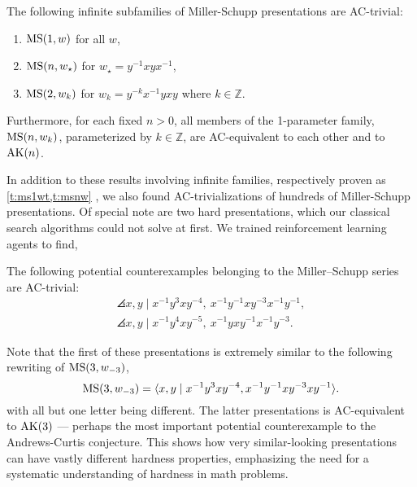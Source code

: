 \begin{introtheorem}
        The following infinite subfamilies of Miller-Schupp presentations are AC-trivial:
        \begin{enumerate}[label=(\roman*)]
            \item $\text{MS}(1, w)$ for all $w$,
            \item $\text{MS}(n, w_\star)$ for $w_\star = y^{-1} x y x^{-1}$,
            \item $\text{MS}(2, w_k)$ for $w_k = y^{-k} x^{-1} y x y$ where $k \in \mathbb{Z}$.
        \end{enumerate}
        Furthermore, for each fixed $n > 0$, all members of the 1-parameter family, $\text{MS}(n, w_k)$, parameterized by $k \in \mathbb{Z}$, are AC-equivalent to each other and to $\text{AK}(n)$.
\end{introtheorem}

In addition to these results involving infinite families, respectively proven as \cref{t:ms1wt,t:msnw} , we also found AC-trivializations of hundreds of Miller-Schupp presentations. Of special note are two hard presentations, which our classical search algorithms could not solve at first. We trained reinforcement learning agents to find,

\begin{introtheorem}\label{thm:MS}
    The following potential counterexamples belonging to the Miller--Schupp series are AC-trivial:
	\begin{gather*}
		\angles{x, y \mid x^{-1} y^3 x y^{-4} , \ x^{-1} y^{-1} x y^{-3} x^{-1} y^{-1}}, \\
		\angles{x, y \mid x^{-1} y^4 x y^{-5} , \ x^{-1} y x y^{-1} x^{-1} y^{-3}}.
	\end{gather*}
\end{introtheorem}

Note that the first of these presentations is extremely similar to the following rewriting of $\text{MS}(3, w_{-3})$,
\[
\text{MS}(3, w_{-3}) = \langle x, y \mid x^{-1} y^3 x y^{-4}, x^{-1} y^{-1} x y^{-3} x y^{-1}\rangle.
\]
with all but one letter being different. The latter presentations is AC-equivalent to $\text{AK}(3)$ --- perhaps the most important potential counterexample to the Andrews-Curtis conjecture.
This shows how very similar-looking presentations can have vastly different hardness properties, emphasizing the need for a systematic understanding of hardness in math problems.


